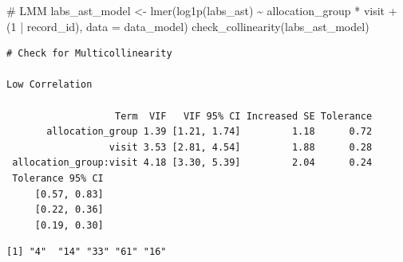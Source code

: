 \documentclass[
  letterpaper,
  DIV=11,
  numbers=noendperiod]{scrartcl}
\newenvironment{Shaded}{\begin{snugshade}}{\end{snugshade}}
\newcommand{\AttributeTok}[1]{\textcolor[rgb]{0.40,0.45,0.13}{#1}}
\newcommand{\CommentTok}[1]{\textcolor[rgb]{0.37,0.37,0.37}{#1}}
\newcommand{\DecValTok}[1]{\textcolor[rgb]{0.68,0.00,0.00}{#1}}
\newcommand{\FunctionTok}[1]{\textcolor[rgb]{0.28,0.35,0.67}{#1}}
\newcommand{\NormalTok}[1]{\textcolor[rgb]{0.00,0.23,0.31}{#1}}
\newcommand{\OtherTok}[1]{\textcolor[rgb]{0.00,0.23,0.31}{#1}}
\newcommand{\SpecialCharTok}[1]{\textcolor[rgb]{0.37,0.37,0.37}{#1}}
\newcommand{\StringTok}[1]{\textcolor[rgb]{0.13,0.47,0.30}{#1}}
\begin{document}
\begin{Shaded}
\begin{Highlighting}[]
\CommentTok{\# LMM}
\NormalTok{labs\_ast\_model }\OtherTok{\textless{}{-}} \FunctionTok{lmer}\NormalTok{(}\FunctionTok{log1p}\NormalTok{(labs\_ast) }\SpecialCharTok{\textasciitilde{}}\NormalTok{ allocation\_group }\SpecialCharTok{*}\NormalTok{ visit }\SpecialCharTok{+}\NormalTok{ (}\DecValTok{1} \SpecialCharTok{|}\NormalTok{ record\_id), }\AttributeTok{data =}\NormalTok{ data\_model)}
\FunctionTok{check\_collinearity}\NormalTok{(labs\_ast\_model)}
\end{Highlighting}
\end{Shaded}

\begin{verbatim}
# Check for Multicollinearity

Low Correlation

                   Term  VIF   VIF 95% CI Increased SE Tolerance
       allocation_group 1.39 [1.21, 1.74]         1.18      0.72
                  visit 3.53 [2.81, 4.54]         1.88      0.28
 allocation_group:visit 4.18 [3.30, 5.39]         2.04      0.24
 Tolerance 95% CI
     [0.57, 0.83]
     [0.22, 0.36]
     [0.19, 0.30]
\end{verbatim}

\begin{Shaded}
\end{Shaded}

\begin{verbatim}
[1] "4"  "14" "33" "61" "16"
\end{verbatim}
\end{document}
